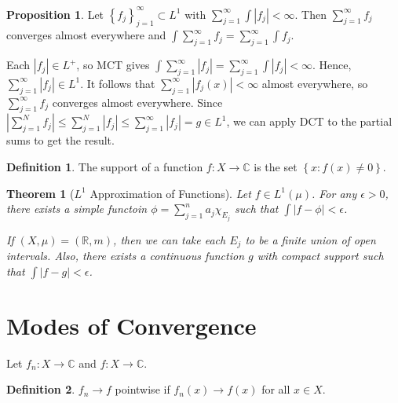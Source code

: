 \documentclass[11pt]{article}
\newtheorem{thm}{Theorem}[section]
\theoremstyle{definition}
\newtheorem{defn}{Definition}[section]
\newtheorem{prop}{Proposition}[section]
\newcommand{\set}[1]{\left\{ #1 \right\}}
\newcommand{\abs}[1]{\left\lvert#1\right\rvert} %
\newcommand{\RR}{\mathbb{R}}
\newcommand{\CC}{\mathbb{C}}
\begin{document}
\begin{prop}
  Let $\set{f_j}_{j=1}^\infty\subset L^1$ with $\sum_{j=1}^\infty\int\abs{f_j}<\infty$.
  Then $\sum_{j=1}^\infty f_j$ converges almost everywhere and $\int\sum_{j=1}^\infty f_j =
  \sum_{j=1}^\infty\int f_j$.
\end{prop}
\proof
Each $\abs{f_j}\in L^+$, so MCT gives $\int\sum_{j=1}^\infty\abs{f_j} =
\sum_{j=1}^\infty\int\abs{f_j}<\infty$. Hence, $\sum_{j=1}^\infty\abs{f_j}\in L^1$. It
follows that $\sum_{j=1}^\infty\abs{f_j(x)}<\infty$ almost everywhere, so
$\sum_{j=1}^\infty f_j$ converges almost everywhere. Since
$\abs{\sum_{j=1}^Nf_j}\le\sum_{j=1}^N\abs{f_j}\le\sum_{j=1}^\infty\abs{f_j}=g\in L^1$, we
can apply DCT to the partial sums to get the result.
\qedhere

\begin{defn}
  The support of a function $f:X\to\CC$ is the set $\set{x:f(x)\neq0}$.
\end{defn}

\begin{thm}[$L^1$ Approximation of Functions]
  Let $f\in L^1(\mu)$. For any $\epsilon>0$, there exists a simple functoin
  $\phi=\sum_{j=1}^na_j\chi_{E_j}$ such that $\int\abs{f-\phi}<\epsilon$.

  If $(X,\mu)=(\RR,m)$, then we can take each $E_j$ to be a finite union of open intervals.
  Also, there exists a continuous function $g$ with compact support such that
  $\int\abs{f-g}<\epsilon$. 
\end{thm}







\section{Modes of Convergence}

Let $f_n:X\to\CC$ and $f:X\to\CC$. 

\begin{defn}
  $f_n\to f$ pointwise if $f_n(x)\to f(x)$ for all $x\in X$. 
\end{defn}
\end{document}
